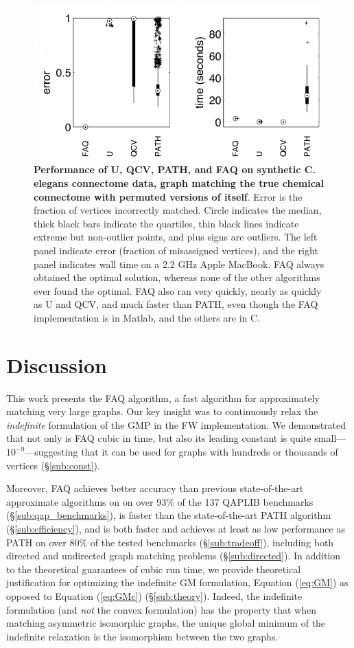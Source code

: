 \documentclass[10pt]{article}
\begin{document}
\begin{figure}[h!]
	\centering
		  \includegraphics[width=0.7\linewidth]{Figure5.pdf}
	\caption{{\bf Performance of U, QCV, PATH, and FAQ on synthetic C. elegans connectome data, graph matching the true chemical connectome with permuted versions of itself}.  Error is the fraction of vertices incorrectly matched.  Circle indicates the median, thick black bars indicate the quartiles, thin black lines indicate extreme but non-outlier points, and plus signs are outliers. The left panel indicate error (fraction of misassigned vertices), and the right panel indicates wall time on a 2.2 GHz Apple MacBook.   FAQ always obtained the optimal solution, whereas none of the other algorithms ever found the optimal.  FAQ also ran very quickly, nearly as quickly as U and QCV, and much faster than PATH, even though the FAQ implementation is in Matlab, and the others are in C.}
	\label{fig:connectomes}
\end{figure}

\section{Discussion}
\label{sec:discussion}

This work presents the FAQ algorithm, a fast algorithm for approximately matching very large graphs.  Our key insight was to continuously relax the {\it indefinite} formulation of the GMP in the FW implementation.
We demonstrated that not only is FAQ cubic in time, but also its leading constant is quite small---$10^{-9}$---suggesting that it can be used for graphs with hundreds or thousands of vertices (\S \ref{sub:const}).  

Moreover, FAQ achieves better accuracy than previous state-of-the-art approximate algorithms on on over $93\%$ of the 137 QAPLIB benchmarks (\S \ref{sub:qap_benchmarks}), is faster than the state-of-the-art PATH algorithm (\S \ref{sub:efficiency}), and is both faster and achieves at least as low performance as PATH on over $80\%$ of the tested benchmarks (\S \ref{sub:tradeoff}),  including both directed and undirected graph matching problems (\S \ref{sub:directed}).  
In addition to the theoretical guarantees of cubic run time, we provide theoretical justification for optimizing the indefinite GM formulation, Equation (\ref{eq:GM}) as opposed to Equation (\ref{eq:GMc}) (\S \ref{sub:theory}).  Indeed, the indefinite formulation (and {\it not} the convex formulation) has the property that when matching asymmetric isomorphic graphs, the unique global minimum of the indefinite relaxation is the isomorphism between the two graphs.  
\end{document}
